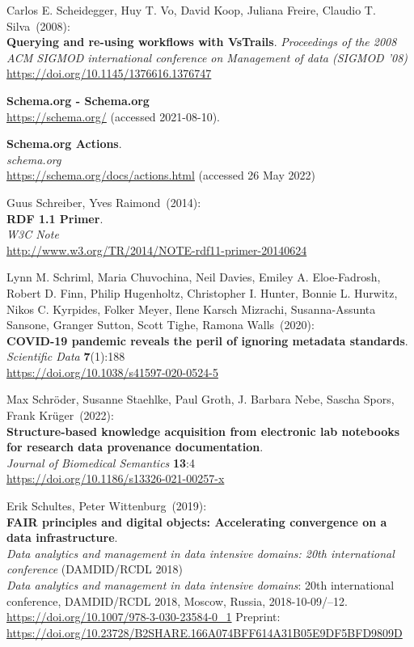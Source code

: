 \begin{thebibliography}{9}
 Carlos E. Scheidegger, Huy T. Vo, David Koop, Juliana Freire, Claudio T. Silva~(2008): \\
\textbf{Querying and re-using workflows with VsTrails}.
\emph{Proceedings of the 2008 ACM SIGMOD international conference on Management of data (SIGMOD '08)}\\
\url{https://doi.org/10.1145/1376616.1376747}

\textbf{Schema.org - Schema.org}\\
\url{https://schema.org/} (accessed 2021-08-10).

\textbf{Schema.org {Actions}}.\\
\emph{schema.org}\\
\url{https://schema.org/docs/actions.html} (accessed 26 May 2022)

Guus Schreiber, Yves Raimond~(2014): \\
\textbf{RDF 1.1 Primer}. \\
\emph{W3C Note} \\
\url{http://www.w3.org/TR/2014/NOTE-rdf11-primer-20140624}

Lynn M. Schriml, Maria Chuvochina, Neil Davies, Emiley A.
Eloe-Fadrosh, Robert D. Finn, Philip Hugenholtz, Christopher I. Hunter,
Bonnie L. Hurwitz, Nikos C. Kyrpides, Folker Meyer, Ilene Karsch
Mizrachi, Susanna-Assunta Sansone, Granger Sutton, Scott Tighe, Ramona
Walls~(2020): \\
\textbf{COVID-19 pandemic reveals the peril of ignoring metadata
standards}.\\
\emph{Scientific Data} \textbf{7}(1):188\\
\url{https://doi.org/10.1038/s41597-020-0524-5}

 Max Schröder, Susanne Staehlke, Paul Groth, J.
 Barbara Nebe, Sascha Spors, Frank Krüger~(2022): \\
\textbf{Structure-based knowledge acquisition from electronic lab
notebooks for research data provenance documentation}.\\
\emph{Journal of Biomedical Semantics} \textbf{13}:4\\
\url{https://doi.org/10.1186/s13326-021-00257-x}

Erik Schultes, Peter Wittenburg~(2019): \\
\textbf{FAIR principles and digital objects: Accelerating convergence on a data infrastructure}.\\
\emph{Data analytics and management in data intensive domains: 20th
international conference} (DAMDID/RCDL 2018)\\
\emph{Data analytics and management in data intensive domains}: 20th international conference,
{DAMDID}/{RCDL} 2018, Moscow, Russia, 2018-10-09/--12. \\
\url{https://doi.org/10.1007/978-3-030-23584-0_1}
Preprint: \url{https://doi.org/10.23728/B2SHARE.166A074BFF614A31B05E9DF5BFD9809D}


\end{thebibliography}
